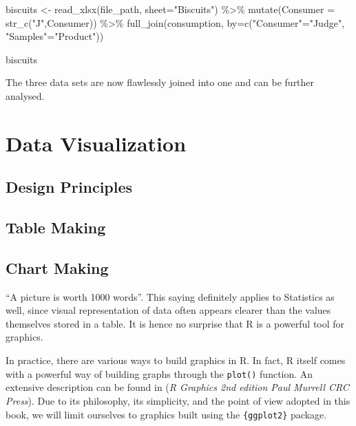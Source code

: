 \documentclass[
]{book}
\newenvironment{Shaded}{\begin{snugshade}}{\end{snugshade}}
\newcommand{\AttributeTok}[1]{\textcolor[rgb]{0.77,0.63,0.00}{#1}}
\newcommand{\FunctionTok}[1]{\textcolor[rgb]{0.00,0.00,0.00}{#1}}
\newcommand{\NormalTok}[1]{#1}
\newcommand{\OtherTok}[1]{\textcolor[rgb]{0.56,0.35,0.01}{#1}}
\newcommand{\SpecialCharTok}[1]{\textcolor[rgb]{0.00,0.00,0.00}{#1}}
\newcommand{\StringTok}[1]{\textcolor[rgb]{0.31,0.60,0.02}{#1}}
\begin{document}
\begin{Shaded}
\begin{Highlighting}[]
\NormalTok{biscuits }\OtherTok{\textless{}{-}} \FunctionTok{read\_xlsx}\NormalTok{(file\_path, }\AttributeTok{sheet=}\StringTok{"Biscuits"}\NormalTok{) }\SpecialCharTok{\%\textgreater{}\%} 
  \FunctionTok{mutate}\NormalTok{(}\AttributeTok{Consumer =} \FunctionTok{str\_c}\NormalTok{(}\StringTok{"J"}\NormalTok{,Consumer)) }\SpecialCharTok{\%\textgreater{}\%} 
  \FunctionTok{full\_join}\NormalTok{(consumption, }\AttributeTok{by=}\FunctionTok{c}\NormalTok{(}\StringTok{"Consumer"}\OtherTok{=}\StringTok{"Judge"}\NormalTok{, }\StringTok{"Samples"}\OtherTok{=}\StringTok{"Product"}\NormalTok{))}

\NormalTok{biscuits}
\end{Highlighting}
\end{Shaded}

The three data sets are now flawlessly joined into one and can be further analysed.

\hypertarget{data-viz}{%
\chapter{Data Visualization}\label{data-viz}}

\hypertarget{design-principles}{%
\section{Design Principles}\label{design-principles}}

\hypertarget{table-making}{%
\section{Table Making}\label{table-making}}

\hypertarget{chart-making}{%
\section{Chart Making}\label{chart-making}}

``A picture is worth 1000 words''. This saying definitely applies to Statistics as well, since visual representation of data often appears clearer than the values themselves stored in a table. It is hence no surprise that R is a powerful tool for graphics.

In practice, there are various ways to build graphics in R. In fact, R itself comes with a powerful way of building graphs through the \texttt{plot()} function. An extensive description can be found in (\emph{R Graphics 2nd edition Paul Murrell CRC Press}). Due to its philosophy, its simplicity, and the point of view adopted in this book, we will limit ourselves to graphics built using the \texttt{\{ggplot2\}} package.
\end{document}
